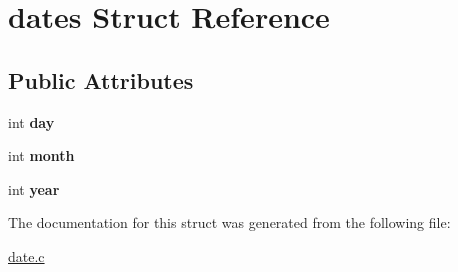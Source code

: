 \hypertarget{structdates}{}\section{dates Struct Reference}
\label{structdates}
\subsection*{Public Attributes}
\begin{DoxyCompactItemize}
\item 
\mbox{\label{structdates_a070b7ad213235ecb4a8131638af526c3}} 
int {\bfseries day}
\item 
\mbox{\label{structdates_a70be7496cafbffda7f5ab9d69b3f266b}} 
int {\bfseries month}
\item 
\mbox{\label{structdates_aa8d33729b689baf96382e084629992a5}} 
int {\bfseries year}
\end{DoxyCompactItemize}


The documentation for this struct was generated from the following file\+:\begin{DoxyCompactItemize}
\item 
\hyperlink{date_8c}{date.\+c}\end{DoxyCompactItemize}
